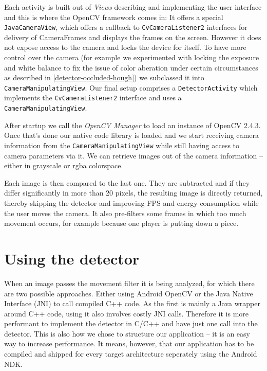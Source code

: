 	Each activity is built out of \textit{Views} describing and implementing the user interface and this is where the OpenCV framework comes in: It offers a special \texttt{JavaCameraView}, which offers a callback to \texttt{CvCameraListener2} interfaces for delivery of CameraFrames and displays the frames on the screen. However it does not expose access to the camera and locks the device for itself. To have more control over the camera (for example we experimented with locking the exposure and white balance to fix the issue of color aberation under certain circumstances as described in \ref{detector-occluded-hough}) we subclassed it into \texttt{CameraManipulatingView}. Our final setup comprises a \texttt{DetectorActivity} which implements the \texttt{CvCameraListener2} interface and uses a \texttt{CameraManipulatingView}.

	After startup we call the \textit{OpenCV Manager} to load an instance of OpenCV 2.4.3. Once that's done our native code library is loaded and we start receiving camera information from the \texttt{CameraManipulatingView} while still having access to camera parameters via it. We can retrieve images out of the camera information -- either in grayscale or rgba colorspace.

	Each image is then compared to the last one. They are subtracted and if they differ significantly in more than 20 pixels, the resulting image is directly returned, thereby skipping the detector and improving FPS and energy consumption while the user moves the camera. It also pre-filters some frames in which too much movement occurs, for example because one player is putting down a piece.

	\section{Using the detector}
	\label{android-detector}
	When an image passes the movement filter it is being analyzed, for which there are two possible approaches. Either using Android OpenCV or the Java Native Interface (JNI) to call compiled C++ code. As the first is mainly a Java wrapper around C++ code, using it also involves costly JNI calls. Therefore it is more performant to implement the detector in C/C++ and have just one call into the detector. This is also how we chose to structure our application -- it is an easy way to increase performance. It means, however, that our application has to be compiled and shipped for every target architecture seperately using the Android NDK.


